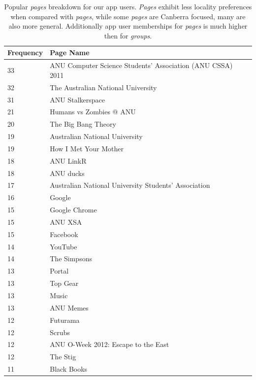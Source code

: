 \begin{table}[!htbp]
\centering
	\begin{tabular}{|l|l|} %
		\hline
		\textbf{\small{Frequency}} & \textbf{\small{Page Name}}  \\ \hline
		33 & \small{ANU Computer Science Students' Association (ANU CSSA) 2011} \\ \hline
		32 & \small{The Australian National University} \\ \hline
		31 & \small{ANU Stalkerspace} \\ \hline
		21 & \small{Humans vs Zombies @ ANU} \\ \hline
		20 & \small{The Big Bang Theory} \\ \hline
		19 & \small{Australian National University} \\ \hline
		19 & \small{How I Met Your Mother} \\ \hline
		18 & \small{ANU LinkR} \\ \hline
		18 & \small{ANU ducks} \\ \hline
		17 & \small{Australian National University Students' Association} \\ \hline
		16 & \small{Google} \\ \hline
		15 & \small{Google Chrome} \\ \hline
		15 & \small{ANU XSA} \\ \hline
		15 & \small{Facebook} \\ \hline
		14 & \small{YouTube} \\ \hline
		14 & \small{The Simpsons} \\ \hline
		13 & \small{Portal} \\ \hline
		13 & \small{Top Gear} \\ \hline
		13 & \small{Music} \\ \hline
		13 & \small{ANU Memes} \\ \hline
		12 & \small{Futurama} \\ \hline
		12 & \small{Scrubs} \\ \hline
		12 & \small{ANU O-Week 2012: Escape to the East} \\ \hline
		12 & \small{The Stig} \\ \hline
		11 & \small{Black Books} \\ \hline
	\end{tabular}
	\caption{Popular \emph{pages} breakdown for our app users. \emph{Pages} exhibit less locality preferences when compared with \emph{pages},
			 while some \emph{pages} are Canberra focused, many are also more general. Additionally app user memberships for \emph{pages} is 
			 much higher then for \emph{groups}.}
	\label{tab:revpol}
\end{table}

